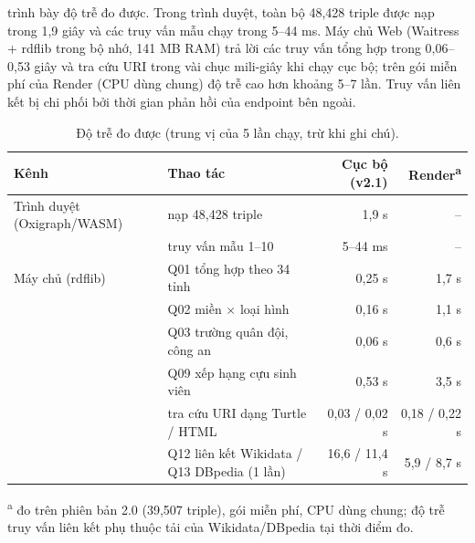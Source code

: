  trình bày độ trễ đo được. Trong trình duyệt, toàn bộ 48{,}428 triple được nạp trong 1,9 giây và các truy
vấn mẫu chạy trong 5--44 ms. Máy chủ Web (Waitress + rdflib trong bộ nhớ, 141 MB RAM) trả lời các truy vấn tổng hợp trong
0,06--0,53 giây và tra cứu URI trong vài chục mili-giây khi chạy cục bộ; trên gói miễn phí của Render (CPU dùng chung) độ
trễ cao hơn khoảng 5--7 lần. Truy vấn liên kết bị chi phối bởi thời gian phản hồi của endpoint bên ngoài.

\begin{table}[htbp]
\centering\small
\caption{Độ trễ đo được (trung vị của 5 lần chạy, trừ khi ghi chú).}
\label{tab:perf}
\begin{tabular}{llrr}
\toprule
Kênh & Thao tác & Cục bộ (v2.1) & Render\textsuperscript{a} \\
\midrule
Trình duyệt (Oxigraph/WASM) & nạp 48{,}428 triple & 1,9 s & -- \\
                            & truy vấn mẫu 1--10 & 5--44 ms & -- \\
Máy chủ (rdflib)            & Q01 tổng hợp theo 34 tỉnh & 0,25 s & 1,7 s \\
                            & Q02 miền \(\times\) loại hình & 0,16 s & 1,1 s \\
                            & Q03 trường quân đội, công an & 0,06 s & 0,6 s \\
                            & Q09 xếp hạng cựu sinh viên & 0,53 s & 3,5 s \\
                            & tra cứu URI dạng Turtle / HTML & 0,03 / 0,02 s & 0,18 / 0,22 s \\
                            & Q12 liên kết Wikidata / Q13 DBpedia (1 lần) & 16,6 / 11,4 s & 5,9 / 8,7 s \\
\bottomrule
\end{tabular}
\par\smallskip\raggedright\footnotesize
\textsuperscript{a} đo trên phiên bản 2.0 (39{,}507 triple), gói miễn phí, CPU dùng chung; độ trễ truy vấn liên kết
phụ thuộc tải của Wikidata/DBpedia tại thời điểm đo.
\end{table}
